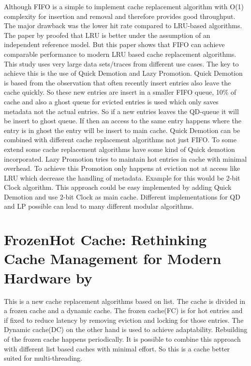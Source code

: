 \documentclass[
	12pt,
	a4paper,
	abstract,
	bibliography=totoc,
	chapterprefix,
	headings=openright,
	numbers=endperiod,
	parskip=half,
	twoside,
]{scrreprt}
\begin{document}
Although FIFO is a simple to implement cache replacement algorithm with O(1) complexity for insertion and removal and therefore provides good throughput.
The major drawback was the lower hit rate compared to LRU-based algorithms.
The paper by \cite{van1992lru} proofed that LRU is better under the assumption of an independent reference model.
But this paper \cite{yang2023fifo} shows that FIFO can achieve comparable performance to modern LRU based cache replacement algorithms.
This study uses very large data sets/traces from different use cases.
The key to achieve this is the use of Quick Demotion and Lazy Promotion.
Quick Demotion is based from the observation that often recently insert entries also leave the cache quickly. So these new entries are insert in a smaller FIFO queue, 10\% of cache and also a ghost queue for evicted entries is used which only saves metadata not the actual entries. So if a new entries leaves the QD-queue it will be insert to ghost queue. If then an access to the same entry happens where the entry is in ghost the entry will be insert to main cache.
Quick Demotion can be combined with different cache replacement algorithms not just FIFO.
To some extend some cache replacement algorithms have some kind of  Quick demotion incorporated. 
Lazy Promotion tries to maintain hot entries in cache with minimal overhead.
To achieve this Promotion only happens at eviction not at access like LRU which decrease the handling of metadata. Example for this would be 2-bit Clock algorithm.
This approach could be easy implemented by adding Quick Demotion and use 2-bit Clock as main cache.
Different implementations for QD and LP possible can lead to many different modular algorithms. 

\section*{FrozenHot Cache: Rethinking Cache Management for Modern Hardware by \cite{qiu2023frozenhot}}

This is a new cache replacement algorithms based on list.
The cache is divided in a frozen cache and a dynamic cache.
The frozen cache(FC) is for hot entries and if fixed to reduce latency by removing eviction and locking for those entries. 
The Dynamic cache(DC) on the other hand is used to achieve adaptability.
Rebuilding of the frozen cache happens periodically.
It is possible to combine this approach with different list based caches with minimal effort.
So this is a cache better suited for multi-threading.
\end{document}
